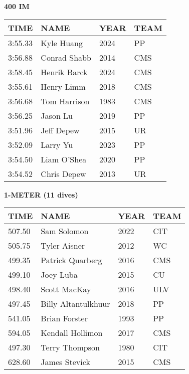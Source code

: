 \begin{center}
\begin{minipage}[t]{0.7\textwidth}
\centering
\textbf{400 IM}\\[0.05cm]
\begin{tabular}{@{}p{1.8cm}p{2.8cm}p{1.2cm}p{1.4cm}@{}}
\hline
\textbf{TIME} & \textbf{NAME} & \textbf{YEAR} & \textbf{TEAM} \\
\hline
3:55.33 & Kyle Huang & 2024 & PP \\
3:56.88 & Conrad Shabb & 2014 & CMS \\
3:58.45 & Henrik Barck & 2024 & CMS \\
3:55.61 & Henry Limm & 2018 & CMS \\
3:56.68 & Tom Harrison & 1983 & CMS \\
3:56.25 & Jason Lu & 2019 & PP \\
3:51.96 & Jeff Depew & 2015 & UR \\
3:52.09 & Larry Yu & 2023 & PP \\
3:54.50 & Liam O'Shea & 2020 & PP \\
3:54.52 & Chris Depew & 2013 & UR \\
\hline
\end{tabular}
\end{minipage}
\end{center}

\vspace{0.4cm}

\begin{center}
\begin{minipage}[t]{0.7\textwidth}
\centering
\textbf{1-METER (11 dives)}\\[0.05cm]
\begin{tabular}{@{}p{1.8cm}p{2.8cm}p{1.2cm}p{1.4cm}@{}}
\hline
\textbf{TIME} & \textbf{NAME} & \textbf{YEAR} & \textbf{TEAM} \\
\hline
507.50 & Sam Solomon & 2022 & CIT \\
505.75 & Tyler Aisner & 2012 & WC \\
499.35 & Patrick Quarberg & 2016 & CMS \\
499.10 & Joey Luba & 2015 & CU \\
498.40 & Scott MacKay & 2016 & ULV \\
497.45 & Billy Altantulkhuur & 2018 & PP \\
541.05 & Brian Forster & 1993 & PP \\
594.05 & Kendall Hollimon & 2017 & CMS \\
497.30 & Terry Thompson & 1980 & CIT \\
628.60 & James Stevick & 2015 & CMS \\
\hline
\end{tabular}
\end{minipage}
\end{center}

